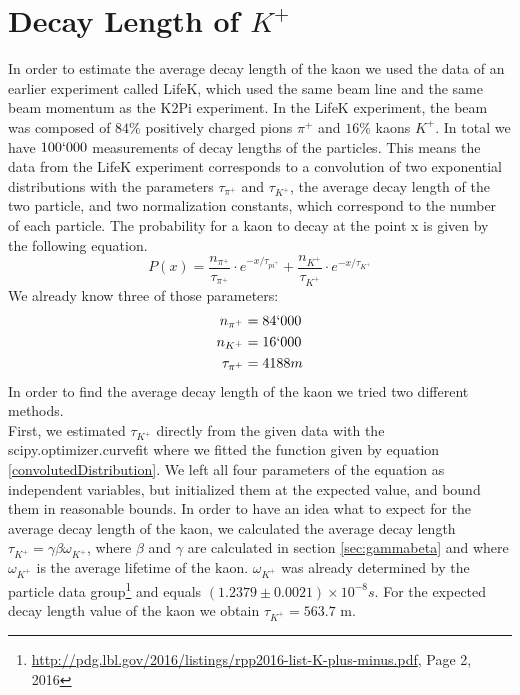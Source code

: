 \documentclass[a4paper,parskip,11pt, DIV12]{scrreprt}
\begin{document}
	\clearpage
	
	\chapter{Decay Length of $K^+$}
	
	In order to estimate the average decay length of the kaon we used the data of an earlier experiment called LifeK, which used the same beam line and the same beam momentum as the K2Pi experiment. In the LifeK experiment, the beam was composed of $84\%$ positively charged pions $\pi^+$ and $16\%$ kaons $K^+$. In total we have $100`000$ measurements of decay lengths of the particles. This means the data from the LifeK experiment corresponds to a convolution of two exponential distributions with the parameters $\tau_{\pi^+}$ and $\tau_{K^+}$, the average decay length of the two particle, and two normalization constants, which correspond to the number of each particle. The probability for a kaon to decay at the point x is given by the following equation.
	\begin{equation}
		\label{convolutedDistribution}
		P(x)=  \frac{n_{\pi^+}}{\tau_{\pi^+}} \cdot e^{-x/ \tau_{pi^+}} + \frac{n_{K^+}}{\tau_{K^+}} \cdot e^{-x/ \tau_{K^+}}
	\end{equation} 
	We already know three of those parameters:
	\begin{align*}
		n_{\pi^+} &= 84`000 \\
		n_{K^+} &= 16`000 \\
		\tau_{\pi^+} &= 4188 m
	\end{align*}
	In order to find the average decay length of the kaon we tried two different methods.\\
	First, we estimated $\tau_{K^+}$ directly from the given data with the scipy.optimizer.curvefit where we fitted the function given by equation \ref{convolutedDistribution}. We left all four parameters of the equation as independent variables, but initialized them at the expected value, and bound them in reasonable bounds. In order to have an idea what to expect for the average decay length of the kaon, we calculated the average decay length $\tau_{K^+}= \gamma \beta \omega_{K^+}$, where $\beta$ and $\gamma$ are calculated in section \ref{sec:gammabeta} and where  $\omega_{K^+}$ is the average lifetime of the kaon. $\omega_{K^+}$ was already determined by the particle data group\footnote{\url{http://pdg.lbl.gov/2016/listings/rpp2016-list-K-plus-minus.pdf}, Page 2, 2016} and equals  $(1.2379 \pm 0.0021) \times 10^{-8} s $. For the expected decay length value of the kaon we obtain $\tau_{K^+} = 563.7$ m.
	
\end{document}
